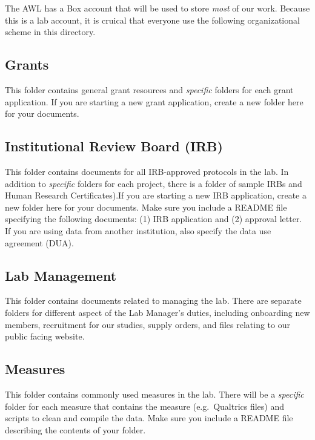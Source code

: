 \documentclass[
]{book}
\begin{document}
The AWL has a Box account that will be used to store \emph{most} of our work. Because this is a lab account, it is cruical that everyone use the following organizational scheme in this directory.

\hypertarget{grants}{%
\subsection{Grants}\label{grants}}

This folder contains general grant resources and \emph{specific} folders for each grant application. If you are starting a new grant application, create a new folder here for your documents.

\hypertarget{institutional-review-board-irb}{%
\subsection{Institutional Review Board (IRB)}\label{institutional-review-board-irb}}

This folder contains documents for all IRB-approved protocols in the lab. In addition to \emph{specific} folders for each project, there is a folder of sample IRBs and Human Research Certificates).If you are starting a new IRB application, create a new folder here for your documents. Make sure you include a README file specifying the following documents: (1) IRB application and (2) approval letter. If you are using data from another institution, also specify the data use agreement (DUA).

\hypertarget{lab-management}{%
\subsection{Lab Management}\label{lab-management}}

This folder contains documents related to managing the lab. There are separate folders for different aspect of the Lab Manager's duties, including onboarding new members, recruitment for our studies, supply orders, and files relating to our public facing website.

\hypertarget{measures}{%
\subsection{Measures}\label{measures}}

This folder contains commonly used measures in the lab. There will be a \emph{specific} folder for each measure that contains the measure (e.g.~Qualtrics files) and scripts to clean and compile the data. Make sure you include a README file describing the contents of your folder.
\end{document}
